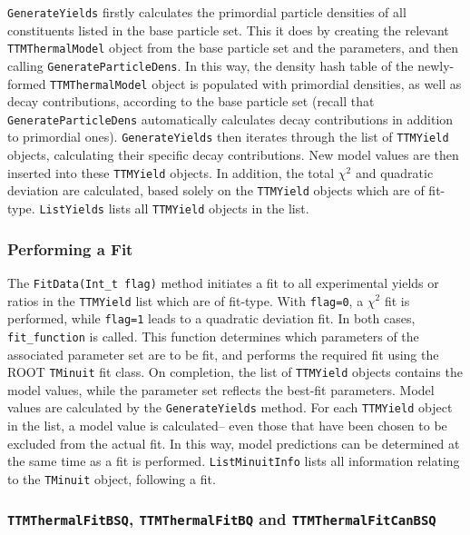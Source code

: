 \documentclass{elsarticle}
\begin{document}
\texttt{GenerateYields} firstly calculates the 
primordial particle densities of all constituents listed in the base particle set. This it 
does by creating the relevant \texttt{TTMThermalModel} object from the base particle set and the parameters, and then calling 
\texttt{GenerateParticleDens}. In this way, the density hash table of the newly-formed \texttt{TTMThermalModel} object is 
populated with primordial densities, as well as decay contributions, according to the base particle set (recall that 
\texttt{GenerateParticleDens} automatically calculates decay contributions in addition to primordial ones). 
\texttt{GenerateYields} then iterates 
through the list of \texttt{TTMYield} objects, calculating their specific decay contributions. New model values are then inserted into these \texttt{TTMYield} objects. In addition, the total 
$\chi^2$ and quadratic deviation are calculated, based solely on the \texttt{TTMYield} objects 
which are of fit-type. \texttt{ListYields} lists all \texttt{TTMYield} objects in the list.\\

\subsubsection{Performing a Fit}

The \texttt{FitData(Int\_t flag)} method initiates a fit to all experimental yields or ratios in the \texttt{TTMYield} list which are of fit-type. With \texttt{flag=0}, a $\chi^2$ fit is performed, while \texttt{flag=1} leads 
to a quadratic deviation fit. In both cases, \texttt{fit\_function} is called. This function determines which parameters of the associated parameter set 
are to be fit, and performs the required fit using the ROOT \texttt{TMinuit} fit class. On completion, the list of \texttt{TTMYield} objects contains the model values, while the parameter set reflects the best-fit parameters. Model values are calculated by the 
\texttt{GenerateYields} method. For each \texttt{TTMYield} object in the list, a model value is calculated-- even those that have been chosen to be excluded from the actual fit. In this way, model 
predictions can be determined at the same time as a fit is performed. \texttt{ListMinuitInfo} lists 
all information relating to the \texttt{TMinuit} object, following a fit. 

\subsubsection{\texttt{TTMThermalFitBSQ}, \texttt{TTMThermalFitBQ} and \texttt{TTMThermalFitCanBSQ}}
\end{document}
